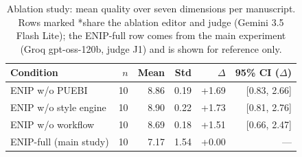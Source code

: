 \begin{table}[t]
\centering\small
\begin{tabular}{lrrrrr}
\toprule
Condition & $n$ & Mean & Std & $\Delta$ & 95\% CI ($\Delta$) \\
\midrule
ENIP w/o PUEBI & 10 & 8.86 & 0.19 & +1.69 & [0.83, 2.66] \\
ENIP w/o style engine & 10 & 8.90 & 0.22 & +1.73 & [0.81, 2.76] \\
ENIP w/o workflow & 10 & 8.69 & 0.18 & +1.51 & [0.66, 2.47] \\
ENIP-full (main study) & 10 & 7.17 & 1.54 & +0.00 & --- \\
\bottomrule
\end{tabular}
\caption{Ablation study: mean quality over seven dimensions per manuscript. Rows marked *share the ablation editor and judge (Gemini 3.5 Flash Lite); the ENIP-full row comes from the main experiment (Groq gpt-oss-120b, judge J1) and is shown for reference only.}
\label{tab:ablation}
\end{table}
